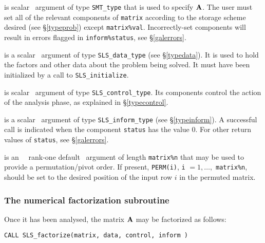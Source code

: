 \documentclass{galahad}
\newcommand{\packagename}{SLS}
\begin{document}
\begin{description}
 is scalar \intentin\ argument of type {\tt SMT\_type}
that is used to specify ${\mathbf{A}}$.
The user must set all of the relevant components of {\tt matrix} according
to the storage scheme desired (see \S\ref{typeprob}) except
{\tt matrix\%val}. Incorrectly-set components will result in errors
flagged in {\tt inform\%status}, see \S\ref{galerrors}.

 is a scalar \intentinout\ argument of type
{\tt \packagename\_data\_type}
(see \S\ref{typedata}). It is used to hold the factors and other
data about the problem being solved.
It must have been initialized by a call to
{\tt \packagename\_ini\-tialize}.

 is scalar \intentin\ argument of type
{\tt \packagename\_control\_type}. Its components control the action
of the analysis phase, as explained in
\S\ref{typecontrol}.

 is a scalar \intentinout\ argument of type
{\tt \packagename\_inform\_type}
(see \S\ref{typeinform}).
A successful call is indicated when the  component {\tt status} has the value 0.
For other return values of {\tt status}, see \S\ref{galerrors}.

 is an \optional\ \intentin\ rank-one default \integer\ argument of
length {\tt matrix\%n} that may be used to provide a permutation/pivot
order.
If present, {\tt PERM(i)}, {\tt i} $= 1, \ldots,$ {\tt matrix\%n}, should be set
to the desired position of the input row $i$ in the permuted matrix.

\end{description}


\subsubsection{The numerical factorization subroutine}
Once it has been analysed, the matrix ${\mathbf{A}}$ may be factorized as follows:

\hskip0.5in
{\tt CALL \packagename\_factorize(matrix, data, control, inform )}
\end{document}

